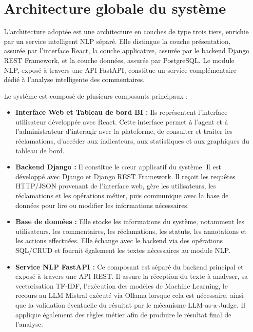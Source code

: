 \documentclass[12pt,a4paper,oneside]{report}
\begin{document}
\section{Architecture globale du système}

L’architecture adoptée est une architecture en couches de type trois tiers, enrichie par un service intelligent NLP séparé. Elle distingue la couche présentation, assurée par l’interface React, la couche applicative, assurée par le backend Django REST Framework, et la couche données, assurée par PostgreSQL. Le module NLP, exposé à travers une API FastAPI, constitue un service complémentaire dédié à l’analyse intelligente des commentaires.

Le système est composé de plusieurs composants principaux :

\begin{itemize}

\item \textbf{Interface Web et Tableau de bord BI :}  
Ils représentent l’interface utilisateur développée avec React. Cette interface permet à l’agent et à l’administrateur d’interagir avec la plateforme, de consulter et traiter les réclamations, d’accéder aux indicateurs, aux statistiques et aux graphiques du tableau de bord.


\item \textbf{Backend Django :}  
Il constitue le cœur applicatif du système. Il est développé avec Django et Django REST Framework. Il reçoit les requêtes HTTP/JSON provenant de l’interface web, gère les utilisateurs, les réclamations et les opérations métier, puis communique avec la base de données pour lire ou modifier les informations nécessaires.


\item \textbf{Base de données :}  
Elle stocke les informations du système, notamment les utilisateurs, les commentaires, les réclamations, les statuts, les annotations et les actions effectuées. Elle échange avec le backend via des opérations SQL/CRUD et fournit également les textes nécessaires au module NLP.

\item \textbf{Service NLP FastAPI :}  
Ce composant est séparé du backend principal et exposé à travers une API REST. Il assure la réception du texte à analyser, sa vectorisation TF-IDF, l’exécution des modèles de Machine Learning, le recours au LLM Mistral exécuté via Ollama lorsque cela est nécessaire, ainsi que la validation éventuelle du résultat par le mécanisme LLM-as-a-Judge. Il applique également des règles métier afin de produire le résultat final de l’analyse.

\end{itemize}
\end{document}
